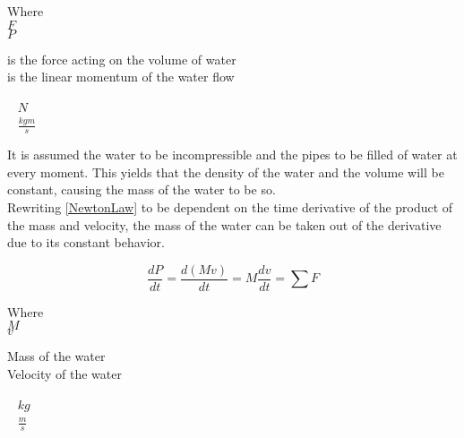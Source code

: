 \begin{minipage}[t]{0.20\textwidth}
Where\\
\hspace*{8mm} $F$ \\
\hspace*{8mm} $P$ 
\end{minipage}
\begin{minipage}[t]{0.68\textwidth}
\vspace*{2mm}
is the force acting on the volume of water\\
is the linear momentum of the water flow

\end{minipage}
\begin{minipage}[t]{0.10\textwidth}
\vspace*{2mm}
\textcolor{White}{te}$\unit{N}$\\
\textcolor{White}{te}$\unit{\frac{kgm}{s}}$
\end{minipage}

It is assumed the water to be incompressible and the pipes to be filled of water at every moment. 
This yields that the density of the water and the volume will be constant, causing the mass of the water to be so. 
\\
%
Rewriting \eqref{NewtonLaw} to be dependent on the time derivative of the product 
of the mass and velocity, the mass of the water can be taken out of the derivative due to its constant behavior.

\begin{equation}
  \frac{dP}{dt} = {\frac{d(M v)}{dt}} = M \frac{dv}{dt} = \sum F
\end{equation} 

\begin{minipage}[t]{0.20\textwidth}
Where\\
\hspace*{8mm} $M$ \\
\hspace*{8mm} $v$ 
\end{minipage}
\begin{minipage}[t]{0.68\textwidth}
\vspace*{2mm}
Mass of the water\\
Velocity of the water

\end{minipage}
\begin{minipage}[t]{0.10\textwidth}
\vspace*{2mm}
\textcolor{White}{te}$\unit{kg}$\\
\textcolor{White}{te}$\unit{\frac{m}{s}}$
\end{minipage}


